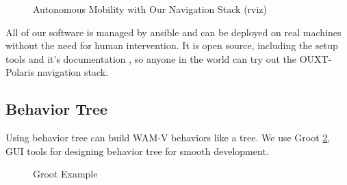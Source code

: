 \documentclass[lettersize,journal]{IEEEtran}
\begin{document}
\begin{figure}[H]
    \begin{center}
    \end{center}
    \caption{Autonomous Mobility with Our Navigation Stack (rviz)}
    \label{fig:whill_rviz}
\end{figure}

All of our software is managed by ansible and can be deployed on real machines without the need for human intervention.
It is open source, including the setup tools \cite{ouxt_automation} and it's documentation \cite{documentation_software},
so anyone in the world can try out the OUXT-Polaris navigation stack.

\subsection{Behavior Tree}
Using behavior tree can build WAM-V behaviors like a tree.  
We use Groot \ref{fig:Groot}, GUI tools for designing behavior tree for smooth development.

\begin{figure}[H]
  \begin{center}
  \end{center}
  \caption{Groot Example}
  \label{fig:Groot}
\end{figure}
\end{document}
